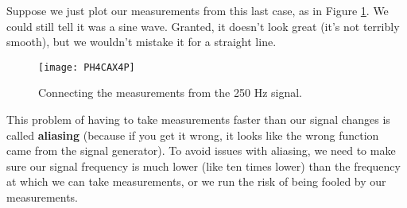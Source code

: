 Suppose we just plot our measurements from this last case, as in
Figure \ref{fig:sine5}. We could still tell it was a sine
wave. Granted, it doesn't look great (it's not terribly smooth),
but we wouldn't mistake it for a straight line. 
\begin{figure}[htbp!]
	\centering
\texttt{[image: PH4CAX4P]}
	\caption{Connecting the measurements from the 250 Hz signal.}
	\label{fig:sine5}
\end{figure}

This problem of having to
take measurements faster than our signal changes is called 
\textbf{aliasing} (because
if you get it wrong, it looks like the wrong function came from the signal
generator). To avoid issues with aliasing, we need to make sure our 
signal frequency is much lower (like
ten times lower) than the frequency at which we can take measurements, 
or we run the risk of being fooled by our measurements.


